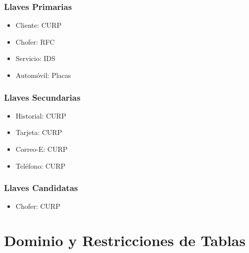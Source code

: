 \documentclass{article}
\begin{document}
       { \noindent
         \subsubsection*{Llaves Primarias}
         \begin{multicols}{4}
           \begin{itemize}
           \item Cliente: CURP
           \item Chofer: RFC
           \item Servicio: IDS
           \item Automóvil: Placas
           \end{itemize}
         \end{multicols}
       }
       
       { \noindent
         \subsubsection*{Llaves Secundarias}
         \begin{multicols}{4}
           \begin{itemize}
           \item Historial: CURP
           \item Tarjeta: CURP
           \item Correo-E: CURP
           \item Teléfono: CURP
           \end{itemize}
         \end{multicols}
       }

       { \noindent
         \subsubsection*{Llaves Candidatas}
         \begin{multicols}{2}
           \begin{itemize}
           \item Chofer: CURP
           \end{itemize}
         \end{multicols}
       }

       \section{Dominio y Restricciones de Tablas}
       
\end{document}

